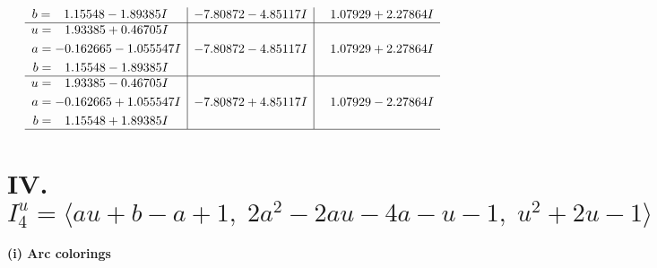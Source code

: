 \documentclass[1p]{elsarticle_modified}
\theoremstyle{definition}
\begin{document}
$$\begin{array}{c|c|c}
\begin{aligned}
b &= \phantom{-}1.15548 - 1.89385 I\end{aligned}
 & -7.80872 - 4.85117 I & \phantom{-}1.07929 + 2.27864 I \\ \hline\begin{aligned}
u &= \phantom{-}1.93385 + 0.46705 I \\
a &= -0.162665 - 1.055547 I \\
b &= \phantom{-}1.15548 - 1.89385 I\end{aligned}
 & -7.80872 - 4.85117 I & \phantom{-}1.07929 + 2.27864 I \\ \hline\begin{aligned}
u &= \phantom{-}1.93385 - 0.46705 I \\
a &= -0.162665 + 1.055547 I \\
b &= \phantom{-}1.15548 + 1.89385 I\end{aligned}
 & -7.80872 + 4.85117 I & \phantom{-}1.07929 - 2.27864 I\\
 \hline 
 \end{array}$$\newpage\newpage\renewcommand{\arraystretch}{1}
\centering \section*{IV. $I^u_{4}= \langle a u+b- a+1,\;2 a^2-2 a u-4 a- u-1,\;u^2+2 u-1 \rangle$}
\flushleft \textbf{(i) Arc colorings}\\
\end{document}
